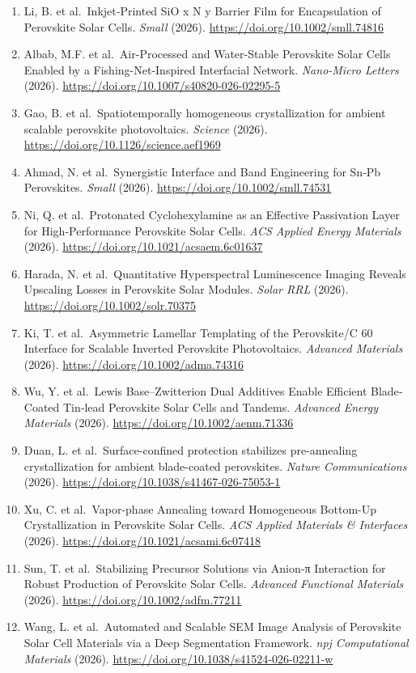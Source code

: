 \documentclass[
  11pt,
]{article}
\begin{document}
\begin{enumerate}
  Identifies Humidity-Tolerant Processing Windows in Hybrid Perovskite
  Solar Cells. \emph{ChemRxiv} (2026).
  \url{https://doi.org/10.26434/chemrxiv-2025-128tn/v2}
\item
  Li, B. et al.~Inkjet‐Printed SiO x N y Barrier Film for Encapsulation
  of Perovskite Solar Cells. \emph{Small} (2026).
  \url{https://doi.org/10.1002/smll.74816}
\item
  Albab, M.F. et al.~Air-Processed and Water-Stable Perovskite Solar
  Cells Enabled by a Fishing-Net-Inspired Interfacial Network.
  \emph{Nano-Micro Letters} (2026).
  \url{https://doi.org/10.1007/s40820-026-02295-5}
\item
  Gao, B. et al.~Spatiotemporally homogeneous crystallization for
  ambient scalable perovskite photovoltaics. \emph{Science} (2026).
  \url{https://doi.org/10.1126/science.aef1969}
\item
  Ahmad, N. et al.~Synergistic Interface and Band Engineering for Sn‐Pb
  Perovskites. \emph{Small} (2026).
  \url{https://doi.org/10.1002/smll.74531}
\item
  Ni, Q. et al.~Protonated Cyclohexylamine as an Effective Passivation
  Layer for High-Performance Perovskite Solar Cells. \emph{ACS Applied
  Energy Materials} (2026). \url{https://doi.org/10.1021/acsaem.6c01637}
\item
  Harada, N. et al.~Quantitative Hyperspectral Luminescence Imaging
  Reveals Upscaling Losses in Perovskite Solar Modules. \emph{Solar RRL}
  (2026). \url{https://doi.org/10.1002/solr.70375}
\item
  Ki, T. et al.~Asymmetric Lamellar Templating of the Perovskite/C 60
  Interface for Scalable Inverted Perovskite Photovoltaics.
  \emph{Advanced Materials} (2026).
  \url{https://doi.org/10.1002/adma.74316}
\item
  Wu, Y. et al.~Lewis Base--Zwitterion Dual Additives Enable Efficient
  Blade‐Coated Tin‐lead Perovskite Solar Cells and Tandems.
  \emph{Advanced Energy Materials} (2026).
  \url{https://doi.org/10.1002/aenm.71336}
\item
  Duan, L. et al.~Surface-confined protection stabilizes pre-annealing
  crystallization for ambient blade-coated perovskites. \emph{Nature
  Communications} (2026).
  \url{https://doi.org/10.1038/s41467-026-75053-1}
\item
  Xu, C. et al.~Vapor-phase Annealing toward Homogeneous Bottom-Up
  Crystallization in Perovskite Solar Cells. \emph{ACS Applied Materials
  \& Interfaces} (2026). \url{https://doi.org/10.1021/acsami.6c07418}
\item
  Sun, T. et al.~Stabilizing Precursor Solutions via Anion‐π Interaction
  for Robust Production of Perovskite Solar Cells. \emph{Advanced
  Functional Materials} (2026). \url{https://doi.org/10.1002/adfm.77211}
\item
  Wang, L. et al.~Automated and Scalable SEM Image Analysis of
  Perovskite Solar Cell Materials via a Deep Segmentation Framework.
  \emph{npj Computational Materials} (2026).
  \url{https://doi.org/10.1038/s41524-026-02211-w}
\end{enumerate}
\end{document}
